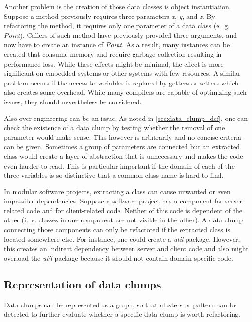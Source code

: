 Another problem is the creation of those data classes is object instantiation. Suppose a method previously requires three parameters \textit{x}, \textit{y}, and \textit{z}. By refactoring the method, it requires only one parameter of a data class (e.~g. \textit{Point}). Callers of such method have previously provided three arguments, and now have to create an instance of \textit{Point}. As a result, many instances can be created that consume memory and require garbage collection resulting in performance loss. While these effects might be minimal, the effect is more significant on embedded systems or other systems with few resources. A similar problem occurs if the access to variables is replaced by getters or setters which also creates some overhead. While many compilers are capable of optimizing such issues, they should nevertheless be considered. 

Also over-engineering can be an issue. As noted in \ref{sec:data_clump_def}, one can check the existence of a data clump by testing whether the removal of one parameter would make sense. This however is arbitrarily and no concise criteria can be given. Sometimes a group of parameters are connected but an extracted class would create a layer of abstraction that is unnecessary and makes the code even harder to read. This is particular important if the domain of each of the three variables is so distinctive that a common class name is hard to find.

In modular software projects, extracting a class can cause unwanted or even impossible dependencies.  Suppose a software project has a component for server-related code and for client-related code. Neither of this code is dependent of the other (i.~e. classes in one component are not visible in the other). A data clump connecting those components can only be refactored if the extracted class is located somewhere else. For instance, one could create a \textit{util} package. However, this creates an indirect dependency between server and client code and also might overload the \textit{util} package because it should not contain domain-specific code. 


\subsection{Representation of data clumps}\label{sec:data_clump_graph}

Data clumps can be represented as a graph, so that clusters or pattern can be detected to further evaluate whether a specific data clump is worth refactoring. 

